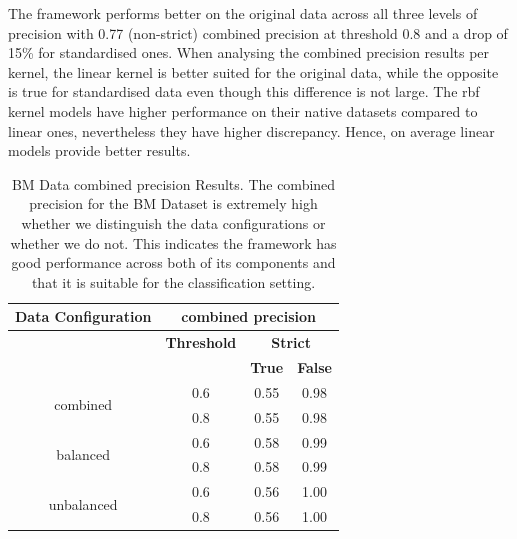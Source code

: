 \documentclass{mpaper}
\begin{document}
The framework performs better on the original data across all three levels of precision with 0.77 (non-strict) combined precision at threshold 0.8 and a drop of 15\% for standardised ones.  When analysing the combined precision results per kernel, the linear kernel is better suited for the original data, while the opposite is true for standardised data even though this difference is not large. The rbf kernel models have higher performance on their native datasets compared to linear ones, nevertheless they have higher discrepancy. Hence, on average linear models provide better results.

\begin{table}[]
\centering
\begin{tabular}{|c|ccc|}
\hline
\textbf{Data Configuration} & \multicolumn{3}{c|}{\textbf{combined precision}}                                              \\ \hline
                              & \multicolumn{1}{c|}{\textbf{Threshold}} & \multicolumn{2}{c|}{\textbf{Strict}}                \\ \cline{2-4} 
                              & \multicolumn{1}{c|}{\textbf{}}          & \textbf{True} & \multicolumn{1}{l|}{\textbf{False}} \\ \hline
\multirow{2}{*}{combined}     & \multicolumn{1}{c|}{0.6}                & 0.55          & 0.98                                \\
                              & \multicolumn{1}{c|}{0.8}                & 0.55          & 0.98                                \\ \hline
\multirow{2}{*}{balanced}     & \multicolumn{1}{c|}{0.6}                & 0.58          & 0.99                                \\
                              & \multicolumn{1}{c|}{0.8}                & 0.58          & 0.99                                \\ \hline
\multirow{2}{*}{unbalanced}   & \multicolumn{1}{c|}{0.6}                & 0.56          & 1.00                                \\
                              & \multicolumn{1}{c|}{0.8}                & 0.56          & 1.00                                \\ \hline
\end{tabular}
\caption{\label{tab:bm_combined_precision}BM Data combined precision Results. The combined precision for the BM Dataset is extremely high whether we distinguish the data configurations or whether we do not. This indicates the framework has good performance across both of its components and that it is suitable for the classification setting. }
\end{table}
\end{document}
